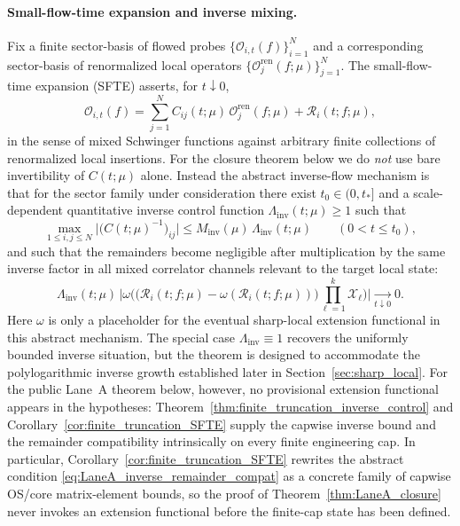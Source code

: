\paragraph{Small-flow-time expansion and inverse mixing.}
Fix a finite sector-basis of flowed probes $\{\mathcal O_{i,t}(f)\}_{i=1}^{N}$ and a corresponding sector-basis of renormalized local operators
$\{\mathcal O^{\mathrm{ren}}_{j}(f;\mu)\}_{j=1}^{N}$.
The small-flow-time expansion (SFTE) asserts, for $t\downarrow 0$,
\begin{equation}\label{eq:SFTE_matrix_LaneA}
\mathcal O_{i,t}(f)
=\sum_{j=1}^{N} C_{ij}(t;\mu)\,\mathcal O^{\mathrm{ren}}_{j}(f;\mu)
+\mathcal R_{i}(t;f;\mu),
\end{equation}
in the sense of mixed Schwinger functions against arbitrary finite collections of renormalized local insertions.
For the closure theorem below we do \emph{not} use bare invertibility of $C(t;\mu)$ alone.
Instead the abstract inverse-flow mechanism is that for the sector family under consideration there exist $t_0\in(0,t_\ast]$ and a scale-dependent quantitative inverse control function
$\Lambda_{\mathrm{inv}}(t;\mu)\ge 1$ such that
\begin{equation}\label{eq:LaneA_quant_inverse_bound}
\max_{1\le i,j\le N}\big|\big(C(t;\mu)^{-1}\big)_{ij}\big|
\le M_{\mathrm{inv}}(\mu)\,\Lambda_{\mathrm{inv}}(t;\mu)
\qquad (0<t\le t_0),
\end{equation}
and such that the remainders become negligible after multiplication by the same inverse factor in all mixed correlator channels relevant to the target local state:
\begin{equation}\label{eq:LaneA_inverse_remainder_compat}
\Lambda_{\mathrm{inv}}(t;\mu)\,
\Big|
\omega\Big(
\big(\mathcal R_i(t;f;\mu)-\omega(\mathcal R_i(t;f;\mu))\big)
\prod_{\ell=1}^k \mathcal X_\ell
\Big)
\Big|
\xrightarrow[t\downarrow 0]{}0.
\end{equation}
Here $\omega$ is only a placeholder for the eventual sharp-local extension functional in this abstract mechanism.
The special case $\Lambda_{\mathrm{inv}}\equiv 1$ recovers the uniformly bounded inverse situation, but the theorem is designed to accommodate the
polylogarithmic inverse growth established later in Section~\ref{sec:sharp_local}.
For the public Lane~A theorem below, however, no provisional extension functional appears in the hypotheses:
Theorem~\ref{thm:finite_truncation_inverse_control} and Corollary~\ref{cor:finite_truncation_SFTE} supply the capwise inverse bound and the remainder compatibility intrinsically on every finite engineering cap.
In particular, Corollary~\ref{cor:finite_truncation_SFTE} rewrites the abstract condition \eqref{eq:LaneA_inverse_remainder_compat}
as a concrete family of capwise OS/core matrix-element bounds, so the proof of Theorem~\ref{thm:LaneA_closure}
never invokes an extension functional before the finite-cap state has been defined.

